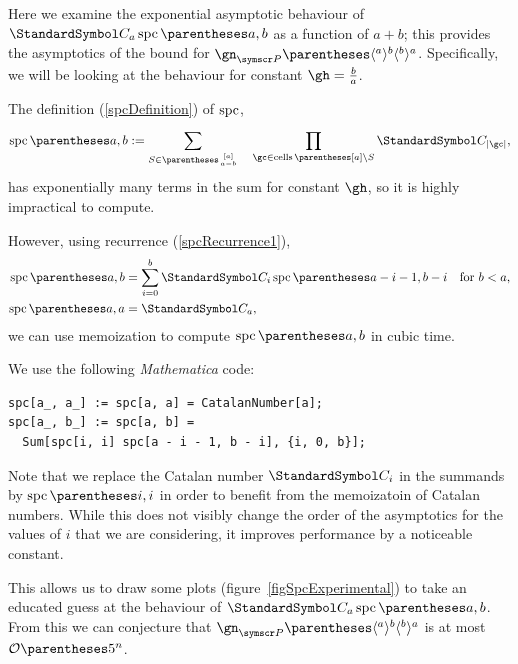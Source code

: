 \label{appendixExperimental}
Here we examine the exponential asymptotic behaviour of $\CatalanNumber a\spc\of{a,b}$ as a
function of $a+b$; this provides the asymptotics of the bound for
$\gn_{\pointset P}\of{\langle^a\rangle^b\langle^b\rangle^a}$. Specifically, we will be looking
at the behaviour for constant $\gh=\frac{b}{a}$.

The definition (\ref{spcDefinition}) of $\operatorname{spc}$,\begin{equation*}
\spc\of{a,b}\DefineAs
\sum{S\in\binom{[a]}{a-b}} \quad \prod{\gc\in\cells\of{[a] \setminus S}}\CatalanNumber {\Cardinality \gc}
\text,
\end{equation*}
has exponentially many terms in the sum for constant $\gh$, so it is highly impractical to compute.

However, using recurrence (\ref{spcRecurrence1}),
\begin{align*}\spc\of{a,b} &= \sum{i=0}[b]
\CatalanNumber {i}
\spc\of{a-i-1,b-i} &\text{for $b<a$,} \\
\spc\of{a,a} &= \CatalanNumber a \text,
\end{align*}
we can use memoization to compute $\spc\of{a,b}$ in cubic time.

We use the following \emph{Mathematica} code:
\begin{verbatim}
spc[a_, a_] := spc[a, a] = CatalanNumber[a];
spc[a_, b_] := spc[a, b] =
  Sum[spc[i, i] spc[a - i - 1, b - i], {i, 0, b}];
\end{verbatim}
Note that we replace the Catalan number $\CatalanNumber i$ in the summands by $\spc\of{i,i}$ in
order to benefit from the memoizatoin of Catalan numbers. While this does not visibly change the
order of the asymptotics for the values of $i$ that we are considering, it improves performance by
a noticeable constant.

This allows us to draw some plots (figure~\ref{figSpcExperimental}) to take an educated guess at
the behaviour of $\CatalanNumber a\spc\of{a,b}$. From this we can conjecture that
$\gn_{\pointset P}\of{\langle^a\rangle^b\langle^b\rangle^a}$ is at most $\BigO\of{5^n}$.

